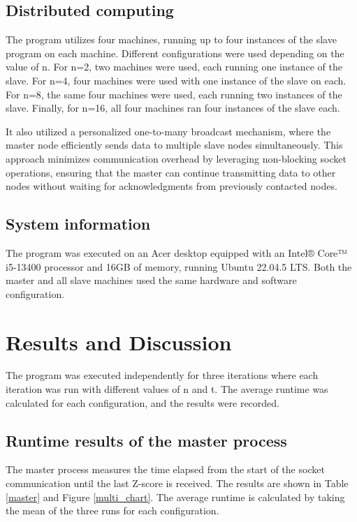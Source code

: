 \documentclass[journal]{./IEEE/IEEEtran}
\begin{document}
\subsection{Distributed computing}
The program utilizes four machines, running up to four instances of the slave program on each machine. Different configurations were used depending on the value of n. For n=2, two machines were used, each running one instance of the slave. For n=4, four machines were used with one instance of the slave on each. For n=8, the same four machines were used, each running two instances of the slave. Finally, for n=16, all four machines ran four instances of the slave each.

It also utilized a personalized one-to-many broadcast mechanism, where the master node efficiently sends data to multiple slave nodes simultaneously. This approach minimizes communication overhead by leveraging non-blocking socket operations, ensuring that the master can continue transmitting data to other nodes without waiting for acknowledgments from previously contacted nodes.


\subsection{System information}
The program was executed on an Acer desktop equipped with an Intel® Core™ i5-13400 processor and 16GB of memory, running Ubuntu 22.04.5 LTS. Both the master and all slave machines used the same hardware and software configuration.

\section{Results and Discussion}
The program was executed independently for three iterations where each iteration was run with different values of n and t. The average runtime was calculated for each configuration, and the results were recorded.


\subsection{Runtime results of the master process}

The master process measures the time elapsed from the start of the socket communication until the last Z-score is received. The results are shown in Table \ref{master} and Figure \ref{multi_chart}. The average runtime is calculated by taking the mean of the three runs for each configuration.
\end{document}
